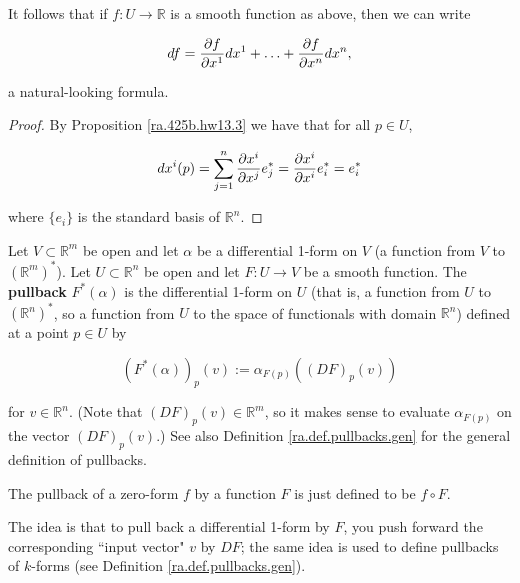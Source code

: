 It follows that if \(f: U \to \mathbb{R}\) is a smooth function as above, then we can write 

\[
df = \pderiv{f}{x^1} dx^1 + \ldots + \pderiv{f}{x^n} dx^n,
\]

a natural-looking formula.

\begin{proof}

By Proposition \ref{ra.425b.hw13.3} we have that for all \(p \in U\),

\[
dx^i(p) = \sum_{j=1}^n \pderiv{x^i}{x^j} e_j^* =  \pderiv{x^i}{x^i} e_i^* = e_i^*
\]

where \(\{e_i\}\) is the standard basis of \(\mathbb{R}^n\).

\end{proof}

\begin{definition}\label{ra.def.pullback.1.form}

Let \(V \subset \mathbb{R}^m\) be open and let \(\alpha\) be a differential 1-form on \(V\) (a function from \(V\) to \((\mathbb{R}^m)^*\)). Let \(U \subset \mathbb{R}^n\) be open and let \(F:U \to V\) be a smooth function. The \textbf{pullback} \(F^*(\alpha)\) is the differential 1-form on \(U\) (that is, a function from \(U\) to \((\mathbb{R}^n)^*\), so a function from \(U\) to the space of functionals with domain \(\mathbb{R}^n\)) defined at a point \(p \in U\) by

\[
(F^*(\alpha))_p(v) := \alpha_{F(p)} ((DF)_p(v))
\]

for \(v \in \mathbb{R}^n\). (Note that \((DF)_p(v) \in \mathbb{R}^m\), so it makes sense to evaluate \(\alpha_{F(p)}\) on the vector \((DF)_p(v)\).) See also Definition \ref{ra.def.pullbacks.gen} for the general definition of pullbacks.

\end{definition}

\begin{example}\label{ra.ex.pullback.zero}

The pullback of a zero-form \(f\) by a function \(F\) is just defined to be \(f \circ F\). 

\end{example}

The idea is that to pull back a differential 1-form by \(F\), you push forward the corresponding ``input vector" \(v\) by \(DF\); the same idea is used to define pullbacks of \(k\)-forms (see Definition \ref{ra.def.pullbacks.gen}).

